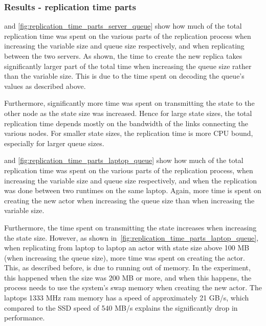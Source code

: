 \documentclass{cslthse-msc}
\begin{document}
\subsubsection*{Results - replication time parts}
 and \cref{fig:replication_time_parts_server_queue} show how much of the total replication time was spent on the various parts of the replication process when increasing the variable size and queue size respectively, and when replicating between the two servers. As shown, the time to create the new replica takes significantly larger part of the total time when increasing the queue size rather than the variable size. This is due to the time spent on decoding the queue's values as described above.

Furthermore, significantly more time was spent on transmitting the state to the other node as the state size was increased. Hence for large state sizes, the total replication time depends mostly on the bandwidth of the links connecting the various nodes. For smaller state sizes, the replication time is more CPU bound, especially for larger queue sizes. %

 and \cref{fig:replication_time_parts_laptop_queue} show how much of the total replication time was spent on the various parts of the replication process, when increasing the variable size and queue size respectively, and when the replication was done between two runtimes on the same laptop. Again, more time is spent on creating the new actor when increasing the queue size than when increasing the variable size. %

Furthermore, the time spent on transmitting the state increases when increasing the state size. However, as shown in~\cref{fig:replication_time_parts_laptop_queue}, when replicating from laptop to laptop an actor with state size above 100 MB (when increasing the queue size), more time was spent on creating the actor. This, as described before, is due to running out of memory. In the experiment, this happened when the size was 200 MB or more, and when this happens, the process needs to use the system's swap memory when creating the new actor. The laptops 1333 MHz ram memory has a speed of approximately 21 GB/s, which compared to the SSD speed of 540 MB/s explains the significantly drop in performance.
\end{document}
